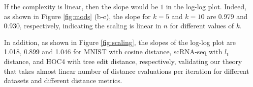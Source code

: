 If the complexity is linear, then the slope would be $1$ in the log-log plot. 
Indeed, as shown in Figure \ref{fig:mods} (b-c), the slope for $k=5$ and $k=10$ are 0.979 and 0.930, respectively, indicating the scaling is linear in $n$ for different values of $k$. 

In addition, as shown in Figure \ref{fig:scaling}, the slopes of the log-log plot are 1.018, 0.899 and 1.046 for MNIST with cosine distance, scRNA-seq with $l_1$ distance, and HOC4 with tree edit distance, respectively, validating our theory that \algname takes almost linear number of distance evaluations per iteration for different datasets and different distance metrics.







